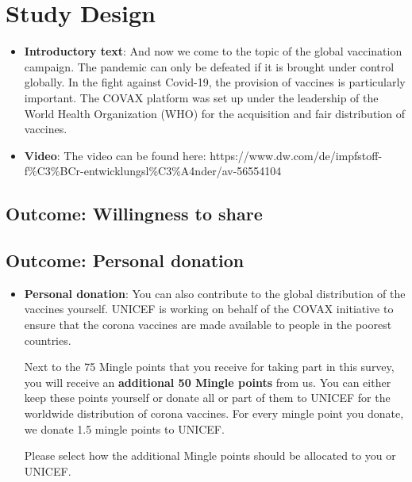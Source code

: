 \documentclass[12pt,oneside,smallheadings,chapterprefix=true]{article}
\begin{document}
\tableofcontents


\clearpage
\section{Study Design}


\begin{itemize}
\item
  \textbf{Introductory text}: And now we come to the topic of the global
  vaccination campaign. The pandemic can only be defeated if it is
  brought under control globally. In the fight against Covid-19, the
  provision of vaccines is particularly important. The COVAX platform
  was set up under the leadership of the World Health Organization (WHO)
  for the acquisition and fair distribution of vaccines.
\item
  \textbf{Video}: The video can be found here:
  https://www.dw.com/de/impfstoff-f\%C3\%BCr-entwicklungsl\%C3\%A4nder/av-56554104
\end{itemize}

\subsection{Outcome: Willingness to share}


\hypertarget{outcome-personal-donation}{%
\subsection{Outcome: Personal
donation}\label{outcome-personal-donation}}

\begin{itemize}
\item
  \textbf{Personal donation}: You can also contribute to the global
  distribution of the vaccines yourself. UNICEF is working on behalf of
  the COVAX initiative to ensure that the corona vaccines are made
  available to people in the poorest countries.

  Next to the 75 Mingle points that you receive for taking part in this
  survey, you will receive an \textbf{additional 50 Mingle points} from
  us. You can either keep these points yourself or donate all or part of
  them to UNICEF for the worldwide distribution of corona vaccines. For
  every mingle point you donate, we donate 1.5 mingle points to UNICEF.

  Please select how the additional Mingle points should be allocated to
  you or UNICEF.
\end{itemize}
\end{document}
